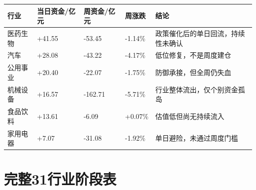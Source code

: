 \begin{exhibitbox}
\begin{tabularx}{\textwidth}{L{2.7cm}R{2.2cm}R{2.2cm}R{2.0cm}X}
\toprule
\textbf{行业} & \textbf{当日资金/亿元} & \textbf{周资金/亿元} & \textbf{周涨跌} & \textbf{结论} \\
\midrule
医药生物 & +41.55 & -53.45 & -1.14\% & 政策催化后的单日回流，持续性未确认 \\
汽车 & +28.08 & -43.22 & -4.17\% & 低位修复，不是周度建仓 \\
公用事业 & +20.40 & -22.07 & -1.75\% & 防御承接，但全周仍失血 \\
机械设备 & +16.57 & -162.71 & -5.71\% & 行业整体流出，仅个别资金孤岛 \\
食品饮料 & +13.61 & -6.09 & +0.07\% & 估值低但尚无持续流入 \\
家用电器 & +7.07 & -31.08 & -1.92\% & 单日避险，未通过周度门槛 \\
\bottomrule
\end{tabularx}
\end{exhibitbox}

\section{完整31行业阶段表}

